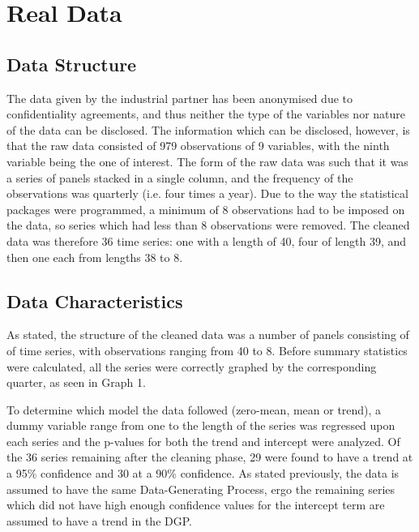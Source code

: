 \section{Real Data}

\subsection{Data Structure}

The data given by the industrial partner has been anonymised due to confidentiality agreements, and thus neither the type of the variables nor nature of the data can be disclosed. The information which can be disclosed, however, is that the raw data consisted of 979 observations of 9 variables, with the ninth variable being the one of interest. The form of the raw data was such that it was a series of panels stacked in a single column, and the frequency of the observations was quarterly (i.e. four times a year). Due to the way the statistical packages were programmed, a minimum of 8 observations had to be imposed on the data, so series which had less than 8 observations were removed. The cleaned data was therefore 36 time series: one with a length of 40, four of length 39, and then one each from lengths 38 to 8.

\subsection{Data Characteristics}

As stated, the structure of the cleaned data was a number of panels consisting of of time series, with observations ranging from 40 to 8. Before summary statistics were calculated, all the series were correctly graphed by the corresponding quarter, as seen in Graph 1.

To determine which model the data followed (zero-mean, mean or trend), a dummy variable range from one to the length of the series was regressed upon each series and the p-values for both the trend and intercept were analyzed. Of the 36 series remaining after the cleaning phase, 29 were found to have a trend at a 95\% confidence and 30 at a 90\% confidence. As stated previously, the data is assumed to have the same Data-Generating Process, ergo the remaining series which did not have high enough confidence values for the intercept term are assumed to have a trend in the DGP.

	

